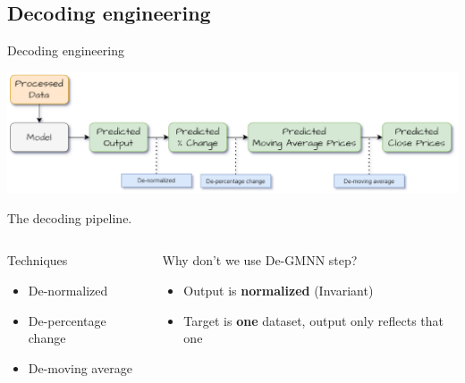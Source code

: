 \documentclass[compress, mathserif, fleqn, 10pt]{beamer}
\begin{document}
	\subsection{Decoding engineering}
	\begin{frame}{Decoding engineering}
		\centerline{\includegraphics[width=0.8\paperwidth]{images/decode.eps}}
		\centerline{The decoding pipeline.}
		\begin{columns}
			\begin{column}{0.5\textwidth}
				\begin{block}{Techniques}
					\begin{minipage}[t][2cm][t]{\textwidth}
						\begin{itemize}
							\item De-normalized
							
							\item De-percentage change
							
							\item De-moving average
						\end{itemize}
					\end{minipage}
				\end{block}
			\end{column}
			\begin{column}{0.5\textwidth}
				\begin{exampleblock}{Why don't we use De-GMNN step?}
					\begin{minipage}[t][2cm][t]{\textwidth}
						\begin{itemize}
							\item Output is \textbf{normalized} (Invariant)
							
							\item Target is \textbf{one} dataset, output only reflects that one
						\end{itemize}
					\end{minipage}
				\end{exampleblock}
			\end{column}
		\end{columns}
	\end{frame}
	
\end{document}
